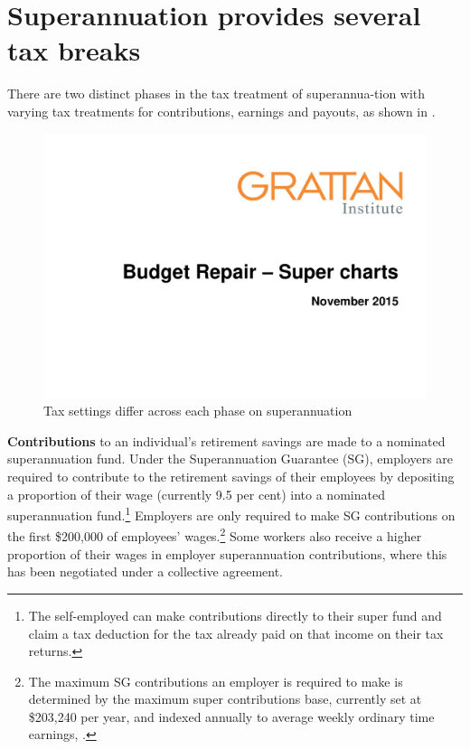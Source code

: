 \documentclass{grattanAlpha}
\begin{document}
\section{Superannuation provides several tax breaks}
There are two distinct phases in the tax treatment of superannua-tion with varying tax treatments for contributions, earnings and payouts, as shown in .
\begin{figure}[t]
\caption{Tax settings differ across each phase on superannuation}\label{fig:SUPER-2-2}
\includegraphics[page=6,width=\columnwidth]{super-atlas/PPTX.pdf}
\end{figure}

\textbf{Contributions} to an individual’s retirement savings are made to a nominated superannuation fund. Under the Superannuation Guarantee (SG), employers are required to contribute to the retirement savings of their employees by depositing a proportion of their wage (currently 9.5 per cent) into a nominated superannuation fund.\footnote{The self-employed can make contributions directly to their super fund and claim a tax deduction for the tax already paid on that income on their tax returns.} Employers are only required to make SG contributions on the first \$200,000 of employees’ wages.\footnote{The maximum SG contributions an employer is required to make is determined by the maximum super contributions base, currently set at \$203,240 per year, and indexed annually to average weekly ordinary time earnings, \textcite{ATO2015MaxSuperContrBase}.} Some workers also receive a higher proportion of their wages in employer superannuation contributions, where this has been negotiated under a collective agreement.
\end{document}

